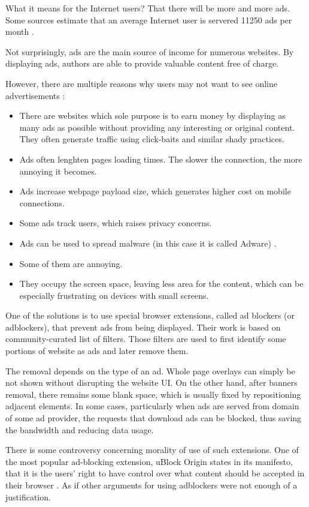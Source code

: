 What it means for the Internet users? That there will be more and more ads. 
Some sources estimate that an average Internet user is servered 11250 ads per month \cite{huff:too-many-ads}.

Not surprisingly, ads are the main source of income for numerous websites. By displaying ads, authors are able to provide
valuable content free of charge. 

However, there are multiple reasons why users may not want to see online advertisements \cite{pagefair:adblock-report}: 
\begin{itemize}
  \item There are websites which sole purpose is to earn money by displaying as many ads 
           as possible without providing any interesting or original content.
           They often generate traffic using click-baits and similar shady practices.
  \item Ads often lenghten pages loading times. The slower the connection, the more annoying it becomes.
  \item Ads increase webpage payload size, which generates higher cost on mobile connections.
  \item Some ads track users, which raises privacy concerns.
  \item Ads can be used to spread malware (in this case it is called Adware) \cite{adblock:adware}.
  \item Some of them are annoying.
  \item They occupy the screen space, leaving less area for the content,
           which can be especially frustrating on devices with small screens.
\end{itemize}

One of the solutions is to use special browser extensions, called ad blockers (or adblockers), 
that prevent ads from being displayed.
Their work is based on community-curated list of filters. Those filters are used to first identify some portions
of website as ads and later remove them.

The removal depends on the type of an ad. Whole page overlays can simply be not shown without disrupting
the website UI. On the other hand, after banners removal, there remains some blank space, which is usually
fixed by repositioning adjacent elements. In some cases, particularly when ads are served from domain
of some ad provider, the requests that download ads can be blocked, thus saving the bandwidth and reducing data usage.

There is some controversy concerning morality of use of such extensions.
One of the most popular ad-blocking extension, uBlock Origin states in its manifesto,
that it is the users' right to have control over what content should be accepted in their browser \cite{ublock:manifesto}.
As if other arguments for using adblockers were not enough of a justification.

